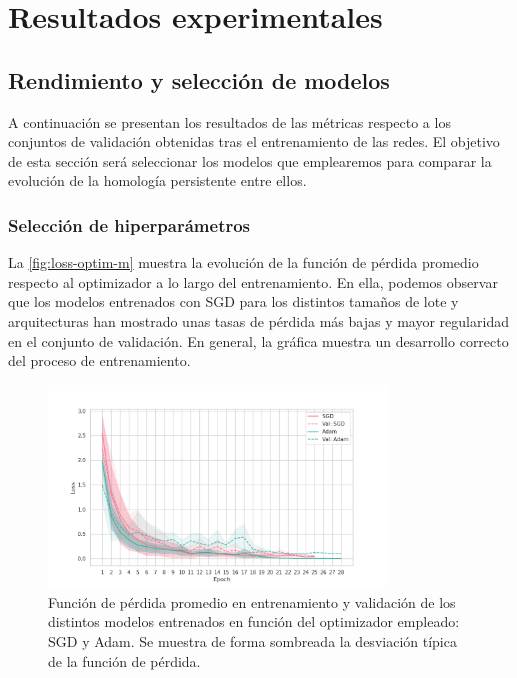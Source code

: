 
\chapter{Resultados experimentales}

\section{Rendimiento y selección de modelos}

A continuación se presentan los resultados de las métricas respecto a los conjuntos de validación obtenidas tras el entrenamiento de las redes. El objetivo de esta sección será seleccionar los modelos que emplearemos para comparar la evolución de la homología persistente entre ellos.

\subsection{Selección de hiperparámetros}
\label{subsec:hiperparam}

La \autoref{fig:loss-optim-m} muestra la evolución de la función de pérdida promedio respecto al optimizador a lo largo del entrenamiento. En ella, podemos observar que los modelos entrenados con SGD para los distintos tamaños de lote y arquitecturas han mostrado unas tasas de pérdida más bajas y mayor regularidad en el conjunto de validación. En general, la gráfica muestra un desarrollo correcto del proceso de entrenamiento.

\begin{figure}[H]
		\centering
		\includegraphics[width=0.8\textwidth]{img/loss-optimizer-marca.png}
		\caption{Función de pérdida promedio en entrenamiento y validación de los distintos modelos entrenados en función del optimizador empleado: SGD y Adam. Se muestra de forma sombreada la desviación típica de la función de pérdida.}
		\label{fig:loss-optim-m}
\end{figure}

